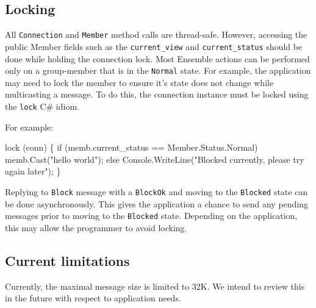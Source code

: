 
\subsection{Locking}
All {\tt Connection} and {\tt Member} method calls are
thread-safe. However, accessing the public Member fields such as the
{\tt current\_view} and {\tt current\_status} should be done while
holding the connection lock. Most Ensemble actions can be performed
only on a group-member that is in the {\tt Normal} state. For example, the
application may need to lock the member to ensure it's state does not
change while multicasting a message. To do this, the connection
instance must be locked using the {\tt lock} C\# idiom.

For example:
\begin{codebox}
  lock (conn) 
  \{
      if (memb.current_status == Member.Status.Normal)
          memb.Cast("hello world");
       else
           Console.WriteLine("Blocked currently, please try again later");
  \}
\end{codebox}

Replying to {\tt Block} message with a {\tt BlockOk} and moving to the
{\tt Blocked} state can be done asynchronously. This gives the
application a chance to send any pending messages 
prior to moving to the {\tt Blocked} state. Depending on the
application, this may allow the programmer to avoid locking. 



\subsection{Current limitations}
Currently, the maximal message size is limited to 32K. We intend to
review this in the future with respect to application needs.











